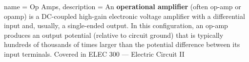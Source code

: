 {
	name = {Op Amps},
	description = {
		An \textbf{operational amplifier }  (often op-amp or opamp) is a DC-coupled high-gain electronic voltage amplifier with a differential input and, usually, a single-ended output. In this configuration, an op-amp produces an output potential (relative to circuit ground) that is typically hundreds of thousands of times larger than the potential difference between its input terminals.  Covered in ELEC 300  --- Electric Circuit II
	}
}